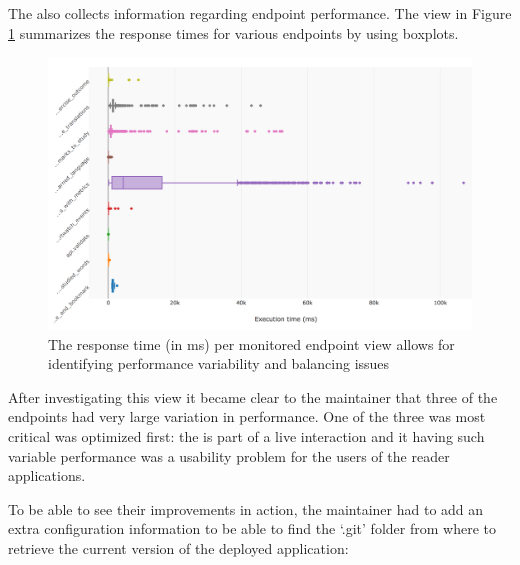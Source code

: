 \documentclass[conference]{IEEEtran}
\begin{document}
  The \tool also collects information regarding endpoint performance. The view in Figure \ref{fig:ep} summarizes the response times for various endpoints by using boxplots. 


  \begin{figure}[h!]
    \centering
    \includegraphics[width=\linewidth]{endpoint_performance.png}
    \caption{The response time (in ms) per monitored endpoint view allows for identifying performance variability and balancing issues}
    \label{fig:ep}
  \end{figure}

  After investigating this view it became clear to the maintainer that three of the endpoints had very large variation in performance. One of the three was most critical was optimized first: the \epTranslations is part of a live interaction and it having such variable performance was a usability problem for the users of the reader applications. 


\newpage
  \niceseparator

  To be able to see their improvements in action, the maintainer had to add an extra configuration information to be able to find the `.git' folder from where to retrieve the current version of the deployed application: 
\end{document}
